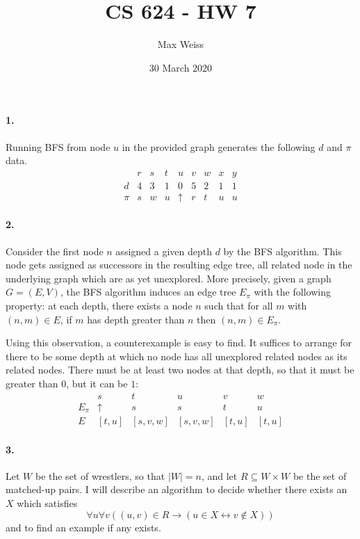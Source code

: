 \documentclass[
]{article}
\date{30 March 2020}
\title{CS 624 - HW 7}
\author{Max Weiss}
\begin{document}
\maketitle

\paragraph{1.} Running BFS from node $u$ in the provided graph generates the following $d$ and $\pi$ data.
\[
\begin{array}{c|cccccccc}
  &r&s&t&u&v&w&x&y\\
  \hline
  d&4&3&1&0&5&2&1&1\\
  \pi&s&w&u&\uparrow&r&t&u&u
\end{array}
\]

\paragraph{2.} Consider the first node $n$ assigned a given depth $d$ by the BFS algorithm.  This node gets assigned as successors in the resulting edge tree, all related node in the underlying graph which are as yet unexplored.  More precisely, given a graph $G = (E,V)$, the BFS algorithm induces an edge tree $E_\pi$ with the following property: at each depth, there exists a node $n$ such that for all $m$ with $(n,m)\in E$, if $m$ has depth greater than $n$ then $(n,m)\in E_\pi$.  

Using this observation, a counterexample is easy to find.  It suffices to arrange for there to be some depth at which no node has all unexplored related nodes as its related nodes. There must be at least two nodes at that depth, so that it must be greater than $0$, but it can be $1$:
\[
\begin{array}{c|ccccc}
  & s & t & u & v & w\\
  \hline
  E_\pi & \uparrow & s & s & t & u\\
  E    & [t,u] & [s,v,w]&[s,v,w]&[t,u]&[t,u]
\end{array}
\]

\paragraph{3.} Let $W$ be the set of wrestlers, so that $|W|=n$, and let $R\subseteq W\times W$ be the set of matched-up pairs.  I will describe an algorithm to decide whether there exists an $X$ which satisfies
\begin{equation}
  \label{3}
 \forall u\forall v ((u,v)\in R \to (u\in X\leftrightarrow v\notin X))
\end{equation}
and to find an example if any exists.
\end{document}
